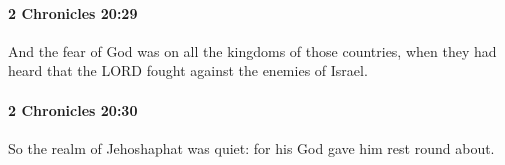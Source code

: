 		\paragraph{2 Chronicles 20:29} %
			\label{2CHRONICLES-20-29}

			And the fear of God was on all the kingdoms of those countries, when they had heard that the LORD fought against the enemies of Israel.


		\paragraph{2 Chronicles 20:30} %
			\label{2CHRONICLES-20-30}

			So the realm of Jehoshaphat was quiet: for his God gave him rest round about.


